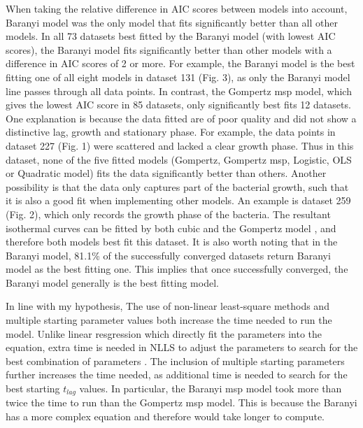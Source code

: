 \documentclass[11pt]{article}
\begin{document}
When taking the relative difference in AIC scores between models into account, Baranyi model was the only model that fits significantly better than all other models. In all 73 datasets best fitted by the Baranyi model (with lowest AIC scores), the Baranyi model fits significantly better than other models with a difference in AIC scores of 2 or more. For example, the Baranyi model is the best fitting one of all eight models in dataset 131 (Fig. 3), as only the Baranyi model line passes through all data points. In contrast, the Gompertz msp model, which gives the lowest AIC score in 85 datasets, only significantly best fits 12 datasets. One explanation is because the data fitted are of poor quality and did not show a distinctive lag, growth and stationary phase. For example, the data points in dataset 227 (Fig. 1) were scattered and lacked a clear growth phase. Thus in this dataset, none of the five fitted models (Gompertz, Gompertz msp, Logistic, OLS or Quadratic model) fits the data significantly better than others. Another possibility is that the data only captures part of the bacterial growth, such that it is also a good fit when implementing other models. An example is dataset 259 (Fig. 2), which only records the growth phase of the bacteria. The resultant isothermal curves can be fitted by both cubic and the Gompertz model \cite{peleg_microbial_2011}, and therefore both models best fit this dataset. It is also worth noting that in the Baranyi model, 81.1\% of the successfully converged datasets return Baranyi model as the best fitting one. This implies that once successfully converged, the Baranyi model generally is the best fitting model. 
\vspace{\baselineskip}

In line with my hypothesis, The use of non-linear least-square methods and multiple starting parameter values both increase the time needed to run the model. Unlike linear resgression which directly fit the parameters into the equation, extra time is needed in NLLS to adjust the parameters to search for the best combination of parameters \cite{kallehauge_comparison_2016}. The inclusion of multiple starting parameters further increases the time needed, as additional time is needed to search for the best starting \(t_{lag}\) values. In particular, the Baranyi msp model took more than twice the time to run than the Gompertz msp model. This is because the Baranyi has a more complex equation and therefore would take longer to compute. 
\vspace{\baselineskip}
\end{document}

